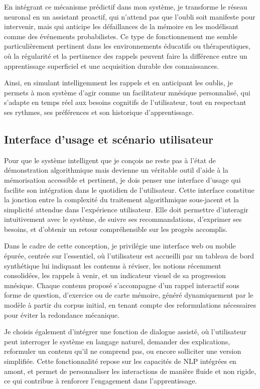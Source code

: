 \documentclass[11pt,a4paper]{report}
\begin{document}
En intégrant ce mécanisme prédictif dans mon système, je transforme le réseau neuronal en un assistant proactif, qui n’attend pas que l’oubli soit manifeste pour intervenir, mais qui anticipe les défaillances de la mémoire en les modélisant comme des événements probabilistes. Ce type de fonctionnement me semble particulièrement pertinent dans les environnements éducatifs ou thérapeutiques, où la régularité et la pertinence des rappels peuvent faire la différence entre un apprentissage superficiel et une acquisition durable des connaissances.

Ainsi, en simulant intelligemment les rappels et en anticipant les oublis, je permets à mon système d’agir comme un facilitateur mnésique personnalisé, qui s’adapte en temps réel aux besoins cognitifs de l’utilisateur, tout en respectant ses rythmes, ses préférences et son historique d’apprentissage.

\subsection{Interface d’usage et scénario utilisateur}

Pour que le système intelligent que je conçois ne reste pas à l’état de démonstration algorithmique mais devienne un véritable outil d’aide à la mémorisation accessible et pertinent, je dois penser une interface d’usage qui facilite son intégration dans le quotidien de l’utilisateur. Cette interface constitue la jonction entre la complexité du traitement algorithmique sous-jacent et la simplicité attendue dans l’expérience utilisateur. Elle doit permettre d’interagir intuitivement avec le système, de suivre ses recommandations, d’exprimer ses besoins, et d’obtenir un retour compréhensible sur les progrès accomplis.

Dans le cadre de cette conception, je privilégie une interface web ou mobile épurée, centrée sur l’essentiel, où l’utilisateur est accueilli par un tableau de bord synthétique lui indiquant les contenus à réviser, les notions récemment consolidées, les rappels à venir, et un indicateur visuel de sa progression mnésique. Chaque contenu proposé s’accompagne d’un rappel interactif sous forme de question, d’exercice ou de carte mémoire, généré dynamiquement par le modèle à partir du corpus initial, en tenant compte des reformulations nécessaires pour éviter la redondance mécanique.

Je choisis également d’intégrer une fonction de dialogue assisté, où l’utilisateur peut interroger le système en langage naturel, demander des explications, reformuler un contenu qu’il ne comprend pas, ou encore solliciter une version simplifiée. Cette fonctionnalité repose sur les capacités de NLP intégrées en amont, et permet de personnaliser les interactions de manière fluide et non rigide, ce qui contribue à renforcer l’engagement dans l’apprentissage.
\end{document}

